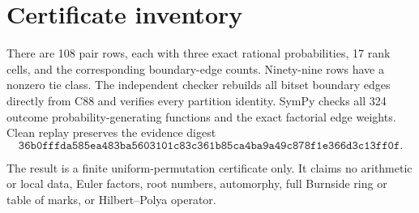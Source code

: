 \documentclass[10pt]{article}
\begin{document}
\section{Certificate inventory}
There are 108 pair rows, each with three exact rational probabilities, 17
rank cells, and the corresponding boundary-edge counts.  Ninety-nine rows
have a nonzero tie class.  The independent checker rebuilds all bitset
boundary edges directly from C88 and verifies every partition identity.
SymPy checks all 324 outcome probability-generating functions and the exact
factorial edge weights.  Clean replay preserves the evidence digest
\[
\texttt{36b0fffda585ea483ba5603101c83c361b85ca4ba9a49c878f1e366d3c13ff0f}.
\]

The result is a finite uniform-permutation certificate only.  It claims no
arithmetic or local data, Euler factors, root numbers, automorphy, full
Burnside ring or table of marks, or Hilbert--Polya operator.
\end{document}
